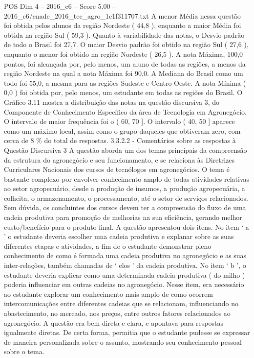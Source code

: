 \begin{textsample}{POS Dim 4 – 2016\_c6 – Score 5.00 – 2016\_c6/enade\_2016\_tec\_agro\_1c1f311707.txt}
A menor Média nessa questão foi obtida pelos alunos da região Nordeste ( 44,8 ), enquanto a maior Média foi obtida na região Sul ( 59,3 ).
Quanto à variabilidade das notas, o Desvio padrão de todo o Brasil foi 27,7.
O maior Desvio padrão foi obtido na região Sul ( 27,6 ), enquanto o menor foi obtido na região Nordeste ( 26,5 ).
A nota Máxima, 100,0 pontos, foi alcançada por, pelo menos, um aluno de todas as regiões, a menos da região Nordeste na qual a nota Máxima foi 90,0.
A Mediana do Brasil como um todo foi 55,0, a mesma para as regiões Sudeste e Centro-Oeste.
A nota Mínima ( 0,0 ) foi obtida por, pelo menos, um estudante em todas as regiões do Brasil.
O Gráfico 3.11 mostra a distribuição das notas na questão discursiva 3, do Componente de Conhecimento Específico da área de Tecnologia em Agronegócio.
O intervalo de maior frequência foi o ( 60, 70 ].
O intervalo ( 40, 50 ] aparece como um máximo local, assim como o grupo daqueles que obtiveram zero, com cerca de 8 \% do total de respostas. 3.3.2.2 - Comentários sobre as respostas à Questão Discursiva 3 A questão aborda um dos temas principais da compreensão da estrutura do agronegócio e seu funcionamento, e se relaciona às Diretrizes Curriculares Nacionais dos cursos de tecnólogos em agronegócios.
O tema é bastante complexo por envolver conhecimento amplo de todas atividades relativas ao setor agropecuário, desde a produção de insumos, a produção agropecuária, a colheita, o armazenamento, o processamento, até o setor de serviços relacionados.
Sem dúvida, os concluintes dos cursos devem ter a compreensão do fluxo de uma cadeia produtiva para promoção de melhorias na sua eficiência, gerando melhor custo/benefício para o produto final.
A questão apresentou dois itens.
No item ‘ a ’ o estudante deveria escolher uma cadeia produtiva e explanar sobre as suas diferentes etapas e atividades, a fim de o estudante demonstrar pleno conhecimento de como é formada uma cadeia produtiva no agronegócio e as suas inter-relações, também chamadas de ‘ elos ’ da cadeia produtiva.
No item ‘ b ’, o estudante deveria explicar como uma determinada cadeia produtiva ( do milho ) poderia influenciar em outras cadeias no agronegócio.
Nesse item, era necessário ao estudante explorar um conhecimento mais amplo de como ocorrem intercomunicações entre diferentes cadeias que se relacionam, influenciando no abastecimento, no mercado, nos preços, entre outros fatores relacionados ao agronegócio.
A questão era bem direta e clara, e apontava para respostas igualmente diretas.
De certa forma, permitia que o estudante pudesse se expressar de maneira personalizada sobre o assunto, mostrando seu conhecimento pessoal sobre o tema.

\end{textsample}
